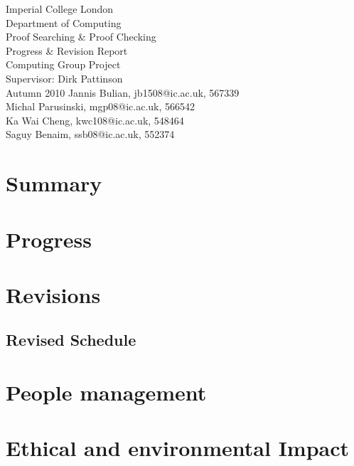 \documentclass[12pt,a4paper]{scrartcl}
\begin{document}
\thispagestyle{empty}
\begin{titlepage}
  \begin{center}
    \vspace*{\fill}
            {{\Large Imperial College London\\ Department of Computing\\}}
            \vfill {{\Huge Proof Searching \& Proof Checking \\
                \vspace{0.2cm}
                     Progress \& Revision Report}}\\
            \vfill {{\large Computing Group Project\\ 
                Supervisor: Dirk Pattinson\\ Autumn 2010}}
            \vfill {Jannis Bulian, jb1508@ic.ac.uk, 567339 \\
                    Michal Parusinski, mgp08@ic.ac.uk, 566542 \\
                    Ka Wai Cheng, kwc108@ic.ac.uk, 548464\\
                    Saguy Benaim, ssb08@ic.ac.uk, 552374}
  \end{center}
\end{titlepage}

\newpage

\tableofcontents
\thispagestyle{empty}

\newpage

\section{Summary}


\section{Progress}


\section{Revisions}


\subsection{Revised Schedule}


\section{People management}


\section{Ethical and environmental Impact}

\end{document}
